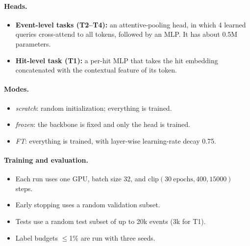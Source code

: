 \documentclass[11pt,a4paper]{article}
\begin{document}
\paragraph{Heads.}
\begin{itemize}
  \item \textbf{Event-level tasks (T2--T4):} an attentive-pooling head, in which 4 learned queries cross-attend to all tokens, followed by an MLP. It has about 0.5M parameters.
  \item \textbf{Hit-level task (T1):} a per-hit MLP that takes the hit embedding concatenated with the contextual feature of its token.
\end{itemize}

\paragraph{Modes.}
\begin{itemize}
  \item \emph{scratch}: random initialization; everything is trained.
  \item \emph{frozen}: the backbone is fixed and only the head is trained.
  \item \emph{FT}: everything is trained, with layer-wise learning-rate decay 0.75.
\end{itemize}

\paragraph{Training and evaluation.}
\begin{itemize}
  \item Each run uses one GPU, batch size 32, and $\mathrm{clip}(30\ \text{epochs}, 400, 15000)$ steps.
  \item Early stopping uses a random validation subset.
  \item Tests use a random test subset of up to 20k events (3k for T1).
  \item Label budgets $\le$1\% are run with three seeds.
\end{itemize}

\end{document}
